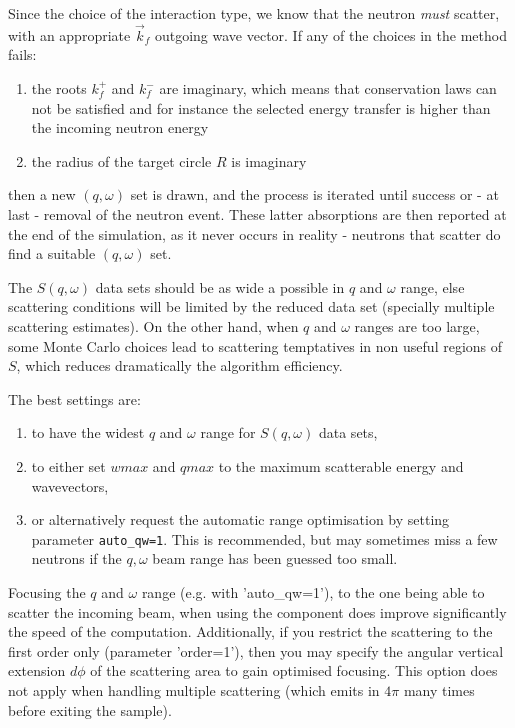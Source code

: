 Since the choice of the interaction type, we know that the neutron \emph{must} scatter, with an appropriate $\vec k_f$ outgoing wave vector. If any of the choices in the method fails:
\begin{enumerate}
\item the roots $k_f^+$ and $k_f^-$ are imaginary, which means that conservation laws can not be satisfied and for instance the selected energy transfer is higher than the incoming neutron energy
\item the radius of the target circle $R$ is imaginary
\end{enumerate}
then a new $(q, \omega)$ set is drawn, and the process is iterated until success or - at last - removal of the neutron event. These latter absorptions are then reported at the end of the simulation, as it never occurs in reality - neutrons that scatter do find a suitable $(q, \omega)$ set.

The $S(q,\omega)$ data sets should be as wide a possible in $q$ and $\omega$ range, else scattering conditions will be limited by the reduced data set (specially multiple scattering estimates). On the other hand, when $q$ and $\omega$ ranges are too large, some Monte Carlo choices lead to scattering temptatives in non useful regions of $S$, which reduces dramatically the algorithm efficiency.

The best settings are:
\begin{enumerate}
\item to have the widest $q$ and $\omega$ range for $S(q,\omega)$ data sets,
\item to either set $wmax$ and $qmax$ to the maximum scatterable energy and wavevectors,
\item or alternatively request the automatic range optimisation by setting parameter \verb+auto_qw=1+. This is recommended, but may sometimes miss a few neutrons if the $q,\omega$ beam range has been guessed too small.
\end{enumerate}

Focusing the $q$ and $\omega$ range (e.g. with 'auto\_qw=1'), to the one being able to scatter the incoming beam, when using the component does improve significantly the speed of the computation. Additionally, if you restrict the scattering to the first order only (parameter 'order=1'), then you may specify the angular vertical extension $d\phi$ of the scattering area to gain optimised focusing. This option does not apply when handling multiple scattering (which emits in $4\pi$ many times before exiting the sample).

